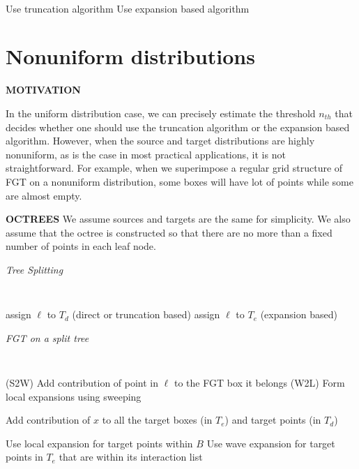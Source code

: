 \documentclass[conference]{IEEEtran}
\begin{document}
{\tt
\begin{algorithmic}
\STATE
     \STATE Use truncation algorithm 
  \ELSE 
     \STATE Use expansion based algorithm
  \ENDIF
\STATE
\end{algorithmic}
}



\section{Nonuniform distributions} 

{\bf MOTIVATION}

In the uniform distribution case, we can precisely estimate the threshold $n_{th}$ that decides whether one should use the truncation algorithm or the expansion based algorithm. However, when the source and target distributions are highly nonuniform, as is the case in most practical applications, it is not straightforward. For example, when we superimpose a regular grid structure of FGT on a nonuniform distribution, some boxes will have lot of points while some are almost empty. 

%

{\bf OCTREES}
We assume sources and targets are the same for simplicity. We also assume that the octree is constructed so that there are no more than a fixed number of points in each leaf node. 

\begin{algorithm}[!h]
\caption{{\em Tree Splitting}}
{\tt
\begin{algorithmic}
\STATE
      \IF {$|\ell| > \sqrt{\delta}$}
          \STATE assign $\ell$ to $T_d$ (direct or truncation based)
      \ELSE
          \STATE assign $\ell$ to $T_e$ (expansion based)
      \ENDIF
  \ENDFOR
\STATE
\end{algorithmic}
}
\end{algorithm}


\begin{algorithm}[!h]
\caption{\em FGT on a split tree}
{\tt
\begin{algorithmic}
\STATE
      \STATE (S2W) Add contribution of point in $\ell$ to the FGT box it belongs
  \ENDFOR
  \STATE
  \STATE (W2L) Form local expansions using sweeping
  \STATE 

          \STATE Add contribution of $x$ to all the target boxes (in $T_e$) and target points (in $T_d$)     
       \ENDFOR  
  \ENDFOR
  
  \STATE 
        \STATE Use local expansion for target points within $B$ 
        \STATE
        \STATE Use wave expansion for target points in $T_e$ that are within its interaction list
     \ENDFOR  
\STATE
\end{algorithmic}
}
\end{algorithm}
\end{document}
